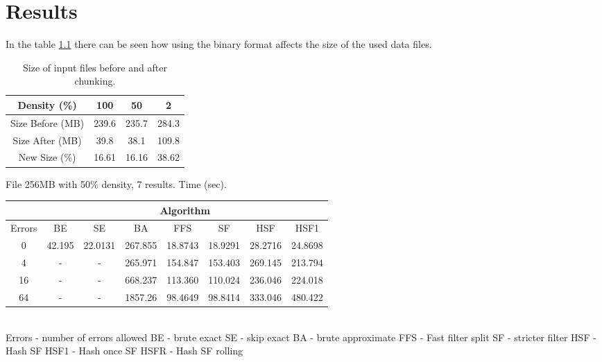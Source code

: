 \chapter{Results}

In the table \ref{tab_chunk} there can be seen how using the binary format affects the size of the used data files.

\begin{table}
\centering
\begin{tabular} {| c | c | c | c |}

\hline
Density (\%) & 100 & 50 & 2 \\
\hline
Size Before (MB) & 239.6 & 235.7 & 284.3 \\
\hline
Size After (MB) & 39.8 & 38.1 & 109.8 \\
\hline
\hline
New Size (\%) & 16.61 & 16.16 & 38.62  \\
\hline
\end{tabular}
\caption{Size of input files before and after chunking.}
\label{tab_chunk}
\end{table}



File 256MB with 50\% density, 7 results.  Time (sec).\\
\begin{tabular} {| c | c | c | c | c | c | c | c|}

\hline
  & \multicolumn{7}{|c|}{Algorithm} \\
\hline
Errors & BE & SE & BA & FFS & SF & HSF & HSF1 \\
\hline
0 & 42.195 & 22.0131 & 267.855 & 18.8743 & 18.9291 & 28.2716 & 24.8698 \\
4 & - & - & 265.971 & 154.847 & 153.403 & 269.145 & 213.794 \\
16 & - & - & 668.237 & 113.360 & 110.024 & 236.046 & 224.018 \\
64 & - & - & 1857.26 & 98.4649 & 98.8414 & 333.046 & 480.422 \\
\hline
\end{tabular}
\\

Errors - number of errors allowed
BE - brute exact
SE - skip exact
BA - brute approximate
FFS - Fast filter split
SF - stricter filter
HSF - Hash SF
HSF1 - Hash once SF
HSFR - Hash SF rolling
